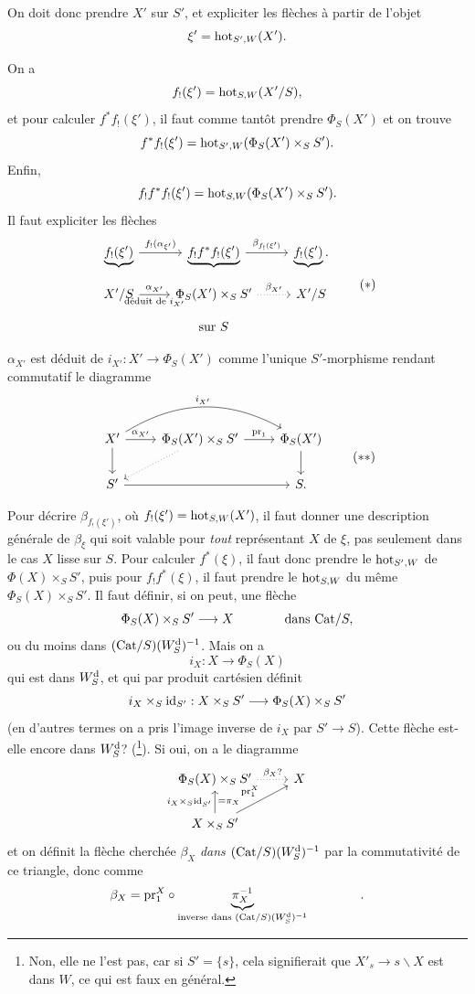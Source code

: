 On doit donc prendre $X'$ sur $S'$, et expliciter les flèches à partir de l'objet
\[
\xi' = \mathrm{hot}_{S',W}(X').
\]

\leavevmode{}On a
\[
f_!(\xi') = \mathrm{hot}_{S,W}(X'/S),
\]
et pour calculer $f^*f_!(\xi')$, il faut comme tantôt prendre $\Phi_S(X')$ et on trouve
\[
f^*f_!(\xi') = \mathrm{hot}_{S',W}(\Phi_S(X')\times_S S').
\]
Enfin,
\[
f_!f^*f_!(\xi') = \mathrm{hot}_{S,W}(\Phi_S(X')\times_S S').
\]
Il faut expliciter les flèches
\[
\begin{tikzcd}[row sep=small]
\underbrace{f_!(\xi')} \arrow[r, "{f_!(\alpha_{\xi'})}"] & \underbrace{f_!f^*f_!(\xi')} \arrow[r, "{\beta_{f_!(\xi')}}"] & \underbrace{f_!(\xi')}. \\
X'/S \arrow[r, "{\alpha_{X'}}", "{\text{déduit de } i_{X'}}"'] & \Phi_S(X')\times_S S' \arrow[r, dotted, "{\beta_{X'}}"] & X'/S \\
 & \text{sur } S &
\end{tikzcd}
\tag*{$(*)$}
\]

$\alpha_{X'}$ est déduit de $i_{X'} : X'\longrightarrow\Phi_S(X')$ comme l'unique $S'$-morphisme rendant commutatif le diagramme
\[
\begin{tikzcd}
X' \arrow[r, "{\alpha_{X'}}"] \arrow[d] \arrow[rr, bend left, "{i_{X'}}"] & \Phi_S(X')\times_S S' \arrow[r, "\pr_1"] \arrow[dl, dotted] & \Phi_S(X') \arrow[d] \\ %
S' \arrow[rr] & & S.
\end{tikzcd}
\tag*{$(**)$}
\]

Pour décrire $\beta_{f_!(\xi')}$, où $f_!(\xi') = \mathrm{hot}_{S,W}(X')$, il faut donner une description générale de $\beta_\xi$ qui soit valable pour \textit{tout} représentant $X$ de $\xi$, pas seulement dans le cas $X$ lisse sur $S$. Pour calculer $f^*(\xi)$, il faut donc prendre le $\mathrm{hot}_{S',W}$ de $\Phi(X)\times_S S'$, puis pour $f_!f^*(\xi)$, il faut prendre le $\mathrm{hot}_{S,W}$ du même $\Phi_S(X)\times_S S'$. Il faut définir, si on peut, une flèche
\[
\Phi_S(X)\times_S S' \longrightarrow X \qquad\qquad \text{dans } \mathrm{Cat}/S,
\]
ou du moins dans $(\mathrm{Cat}/S)(W^{\mathrm{d}}_S)^{-1}$. Mais on a
\[
i_X : X \longrightarrow \Phi_S(X)
\]
qui est dans $W^{\mathrm{d}}_S$, et qui par produit cartésien définit
\[
i_X\times_S\mathrm{id}_{S'} : X\times_S S' \longrightarrow \Phi_S(X)\times_S S'
\]
(en d'autres termes on a pris l'image inverse de $i_X$ par $S'\longrightarrow S$). Cette flèche est-elle encore dans $W^{\mathrm{d}}_S$? (\footnote[69]{Non, elle ne l'est pas, car si $S'=\{s\}$, cela signifierait que $X'_s\longrightarrow s\backslash X$ est dans $W$, ce qui est faux en général.}). Si oui, on a le diagramme
\[
\begin{tikzcd}
\Phi_S(X)\times_S S' \arrow[r, dotted, "\beta_X ?"] & X \\
X\times_S S' \arrow[u, "{i_X\times_S\id_{S'}}", "{=\pi_X}"'] \arrow[ur, "\pr_1^X"] &
\end{tikzcd}
\]
et on définit la flèche cherchée $\beta_X$ \textit{dans} $(\mathrm{Cat}/S)(W^{\mathrm{d}}_S)^{-1}$ par la commutativité de ce triangle, donc comme
\[
\beta_X = \mathrm{pr}_1^X\circ\underbrace{\pi_X^{-1}}_{\text{inverse dans }(\mathrm{Cat}/S)(W^{\mathrm{d}}_S)^{-1}} \qquad\qquad .
\]


